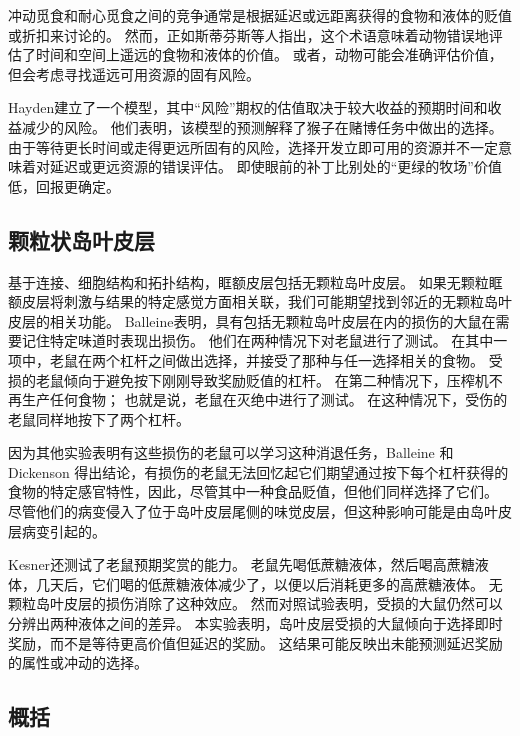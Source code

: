 冲动觅食和耐心觅食之间的竞争通常是根据延迟或远距离获得的食物和液体的贬值或折扣来讨论的。
然而，正如斯蒂芬斯等人\cite{stephens2004impulsiveness}指出，这个术语意味着动物错误地评估了时间和空间上遥远的食物和液体的价值。
或者，动物可能会准确评估价值，但会考虑寻找遥远可用资源的固有风险。 \par


Hayden\cite{hayden2007temporal}建立了一个模型，其中“风险”期权的估值取决于较大收益的预期时间和收益减少的风险。
他们表明，该模型的预测解释了猴子在赌博任务中做出的选择。
由于等待更长时间或走得更远所固有的风险，选择开发立即可用的资源并不一定意味着对延迟或更远资源的错误评估。
即使眼前的补丁比别处的“更绿的牧场”价值低，回报更确定。



\subsection{颗粒状岛叶皮层}

基于连接、细胞结构和拓扑结构，眶额皮层包括无颗粒岛叶皮层\cite{carmichael1994architectonic}。
如果无颗粒眶额皮层将刺激与结果的特定感觉方面相关联，我们可能期望找到邻近的无颗粒岛叶皮层的相关功能。
Balleine\cite{balleine2000effect}表明，具有包括无颗粒岛叶皮层在内的损伤的大鼠在需要记住特定味道时表现出损伤。
他们在两种情况下对老鼠进行了测试。
在其中一项中，老鼠在两个杠杆之间做出选择，并接受了那种与任一选择相关的食物。
受损的老鼠倾向于避免按下刚刚导致奖励贬值的杠杆。
在第二种情况下，压榨机不再生产任何食物；
也就是说，老鼠在灭绝中进行了测试。
在这种情况下，受伤的老鼠同样地按下了两个杠杆。\par


因为其他实验表明有这些损伤的老鼠可以学习这种消退任务，Balleine 和 Dickenson 得出结论，有损伤的老鼠无法回忆起它们期望通过按下每个杠杆获得的食物的特定感官特性，因此，尽管其中一种食品贬值，但他们同样选择了它们。
尽管他们的病变侵入了位于岛叶皮层尾侧的味觉皮层，但这种影响可能是由岛叶皮层病变引起的。\par


Kesner\cite{kesner2007role}还测试了老鼠预期奖赏的能力。
老鼠先喝低蔗糖液体，然后喝高蔗糖液体，几天后，它们喝的低蔗糖液体减少了，以便以后消耗更多的高蔗糖液体。
无颗粒岛叶皮层的损伤消除了这种效应。
然而对照试验表明，受损的大鼠仍然可以分辨出两种液体之间的差异。
本实验表明，岛叶皮层受损的大鼠倾向于选择即时奖励，而不是等待更高价值但延迟的奖励。
这结果可能反映出未能预测延迟奖励的属性或冲动的选择。\par



\subsection{概括}

